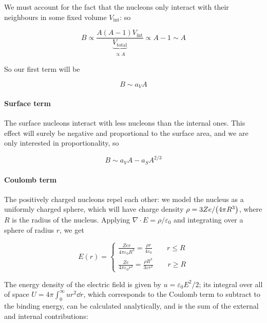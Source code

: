 \documentclass{article}
\begin{document}
We must account for the fact that the nucleons only interact with their neighbours in some fixed volume \(V_ \text{int}\): so

\begin{equation}
    B \propto \frac{A(A-1) V _ \text{int}}{ \underbrace{V_\text{total}}_{\substack{\propto A}} } \propto A-1 \sim A
\end{equation}

So our first term will be

\begin{equation}
    B \sim a_V A
\end{equation}

\paragraph{Surface term}

The surface nucleons interact with less nucleons than the internal ones. This effect will surely be negative and proportional to the surface area, and we are only interested in proportionality, so

\begin{equation}
    B \sim a_V A - a_S A ^{2/3}
\end{equation}

\paragraph{Coulomb term}

The positively charged nucleons repel each other: we model the nucleus as a uniformly charged sphere, which will have charge density \(\rho = 3Ze / \qty(4 \pi R^3)\), where \(R\) is the radius of the nucleus. Applying \(\nabla \cdot E = \rho/ \varepsilon_0\) and integrating over a sphere of radius \(r\), we get

\begin{equation}
    E(r) = \begin{cases}
        \frac{Zer}{4 \pi \varepsilon_0 R^3 } = \frac{\rho r}{4 \varepsilon_0} \qquad r \leq R  \\
        \frac{Ze}{4 \pi \varepsilon_0 r^2} = \frac{\rho R^3}{3 \varepsilon r^2} \qquad r \geq R
\end{cases}
\end{equation}

The energy density of the electric field is given by \(u = \varepsilon_0 E^2/2\); its integral over all of  space \(U = 4 \pi \int _{0}   ^{\infty} ur^2\dd{r}   \), which corresponds to the Coulomb term to subtract to the binding energy, can be calculated analytically, and is the sum of the external and internal contributions:
\end{document}
